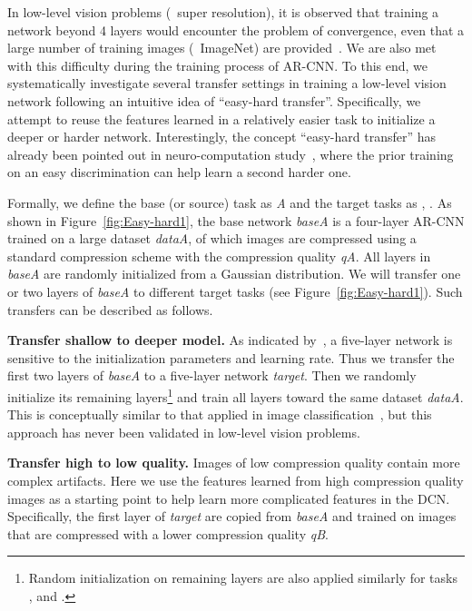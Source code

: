 \documentclass[10pt,twocolumn,letterpaper]{article}
\begin{document}
In low-level vision problems (\eg~super resolution), it is observed that training a network beyond 4 layers would encounter the problem of convergence, even that a large number of training images (\eg~ImageNet) are provided~\cite{Dong2014}.
We are also met with this difficulty during the training process of AR-CNN.
To this end, we systematically investigate several transfer settings in training a low-level vision network following an intuitive idea of ``easy-hard transfer''.
Specifically, we attempt to reuse the features learned in a relatively easier task to initialize a deeper or harder network.
Interestingly, the concept ``easy-hard transfer'' has already been pointed out in neuro-computation study~\cite{Gluck1993}, where the prior training on an easy discrimination can help learn a second harder one.


Formally, we define the base (or source) task as \textit{A} and the target tasks as \textit{}, . As shown in Figure~\ref{fig:Easy-hard1}, the base network \textit{baseA} is a four-layer AR-CNN trained on a large dataset \textit{dataA}, of which images are compressed using a standard compression scheme with the compression quality \textit{qA}. All layers in \textit{baseA} are randomly initialized from a Gaussian distribution. We will transfer one or two layers of \textit{baseA} to different target tasks (see Figure~\ref{fig:Easy-hard1}). Such transfers can be described as follows.

\textbf{Transfer shallow to deeper model.}
As indicated by~\cite{Dong2014a}, a five-layer network is sensitive to the initialization parameters and learning rate. Thus we transfer the first two layers of \textit{baseA} to a five-layer network \textit{target}. Then we randomly initialize its remaining layers\footnote{Random initialization on remaining layers are also applied similarly for tasks \textit{}, and \textit{}.} and train all layers toward the same dataset \textit{dataA}. This is conceptually similar to that applied in image classification~\cite{Simonyan2014}, but this approach has never been validated in low-level vision problems.

\textbf{Transfer high to low quality.}
Images of low compression quality contain more complex artifacts. Here we use the features learned from high compression quality images as a starting point to help learn more complicated features in the DCN. Specifically, the first layer of \textit{target} are copied from \textit{baseA} and trained on images that are compressed with a lower compression quality \textit{qB}.
\end{document}

